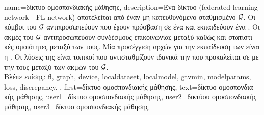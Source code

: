 {name={\foreignlanguage{greek}{δίκτυο ομοσπονδιακής μάθησης}},
	description={\foreignlanguage{greek}{Ένα δίκτυο}  
		(federated learning network - FL network) \foreignlanguage{greek}{αποτελείται από έναν μη κατευθυνόμενο 
		σταθμισμένο}  $\mathcal{G}$. \foreignlanguage{greek}{Οι κόμβοι του $\mathcal{G}$ 
		αντιπροσωπεύ\-ουν}  \foreignlanguage{greek}{που έχουν πρόσβαση σε ένα} 
		 \foreignlanguage{greek}{και εκπαιδεύουν ένα} . 
		\foreignlanguage{greek}{Οι ακμές του $\mathcal{G}$ αντιπροσωπεύ\-ουν συνδέσμους επικοινωνίας μεταξύ} 
		 \foreignlanguage{greek}{καθώς και στατιστικές ομοιότητες μεταξύ των}  
		\foreignlanguage{greek}{τους. Μία προσέγγιση αρχών για την εκπαίδευση των}  
		\foreignlanguage{greek}{είναι η} . \foreignlanguage{greek}{Οι λύσεις της}  
		\foreignlanguage{greek}{είναι τοπικοί}  \foreignlanguage{greek}{που αντισταθμίζουν ιδανικά 
		την}  \foreignlanguage{greek}{που προκαλείται σε}  \foreignlanguage{greek}{με την} 
		 \foreignlanguage{greek}{τους μεταξύ των ακμών του} $\mathcal{G}$. \\
	    	\foreignlanguage{greek}{Βλέπε επίσης:} \gls{fl}, \gls{graph}, \gls{device}, \gls{localdataset}, \gls{localmodel}, \gls{gtvmin},
		\glspl{modelparam}, \gls{loss}, \gls{discrepancy}. },
	  first={\foreignlanguage{greek}{δίκτυο ομοσπονδιακής μάθησης}},
	  text={\foreignlanguage{greek}{δίκτυο ομοσπονδιακής μάθησης}},
	  user1={\foreignlanguage{greek}{δίκτυο ομοσπονδιακής μάθησης}}, %
  	  user2={\foreignlanguage{greek}{δικτύου ομοσπονδιακής μάθησης}}, %
	  user3={\foreignlanguage{greek}{δίκτυο ομοσπονδιακής μάθησης}} %
}

